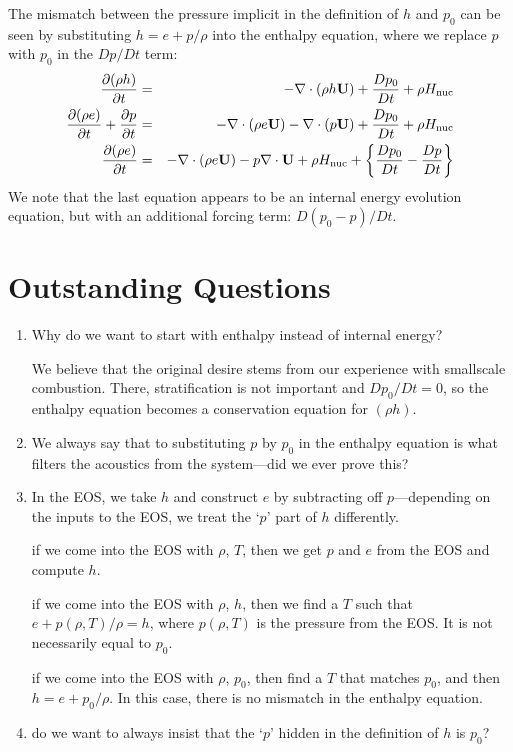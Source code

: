The mismatch between the pressure implicit in the definition of $h$
and $p_0$ can be seen by substituting $h = e + p/\rho$ into the
enthalpy equation, where we replace $p$ with $p_0$ in the $Dp/Dt$ term:
\begin{eqnarray}
\frac{\partial(\rho h)}{\partial t} &=& -\nabla\cdot(\rho h\Ub) + 
  \frac{Dp_0}{Dt} + \rho\Hnuc \nonumber \\
%
\frac{\partial(\rho e)}{\partial t} + \frac{\partial p}{\partial t} &=&
 -\nabla\cdot(\rho e\Ub) -\nabla\cdot(p\Ub) + \frac{Dp_0}{Dt} + \rho\Hnuc \nonumber \\
%
\frac{\partial(\rho e)}{\partial t} &=&
 -\nabla\cdot(\rho e\Ub) - p\nabla\cdot\Ub + \rho\Hnuc + 
  \left \{ \frac{Dp_0}{Dt} - \frac{Dp}{Dt} \right \} \nonumber 
\end{eqnarray}
We note that the last equation appears to be an internal energy
evolution equation, but with an additional forcing term: $D(p_0 - p)/Dt$.

\section{Outstanding Questions}

\begin{enumerate}
\item Why do we want to start with enthalpy instead of internal energy?

   We believe that the original desire stems from our experience with smallscale 
   combustion.  There, stratification is not important and $Dp_0/Dt = 0$, so
   the enthalpy equation becomes a conservation equation for $(\rho h)$.

\item We always say that to substituting $p$ by $p_0$ in the enthalpy equation
   is what filters the acoustics from the system---did we ever prove this?


\item In the EOS, we take $h$ and construct $e$ by subtracting off
  $p$---depending on the inputs to the EOS, we treat the `$p$' part of $h$
  differently.

   if we come into the EOS with $\rho$, $T$, then we get $p$ and $e$ from
   the EOS and compute $h$.

   if we come into the EOS with $\rho$, $h$, then we find a $T$ such that
   $e + p(\rho,T)/\rho = h$, where $p(\rho,T)$ is the pressure from the EOS.
   It is not necessarily equal to $p_0$.

   if we come into the EOS with $\rho$, $p_0$, then find a $T$ that matches
   $p_0$, and then $h = e + p_0/\rho$.  In this case, there is no mismatch
   in the enthalpy equation.


\item do we want to always insist that the `$p$' hidden in the definition of
   $h$ is $p_0$?

\end{enumerate}






